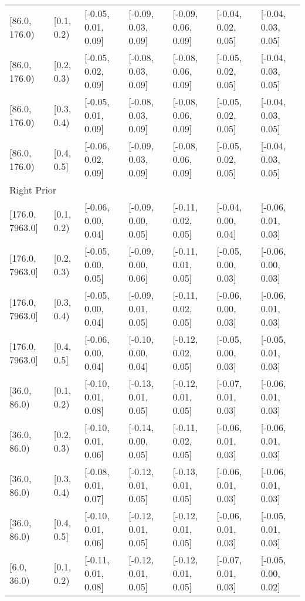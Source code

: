 \begin{table}[ht]
\begin{tabular}{lllllll}
  {[86.0, 176.0)} & {[0.1, 0.2)} & {[-0.05, 0.01, 0.09]} & {[-0.09, 0.03, 0.09]} & {[-0.09, 0.06, 0.09]} & {[-0.04, 0.02, 0.05]} & {[-0.04, 0.03, 0.05]} \\ 
  {[86.0, 176.0)} & {[0.2, 0.3)} & {[-0.05, 0.02, 0.09]} & {[-0.08, 0.03, 0.09]} & {[-0.08, 0.06, 0.09]} & {[-0.05, 0.02, 0.05]} & {[-0.04, 0.03, 0.05]} \\ 
  {[86.0, 176.0)} & {[0.3, 0.4)} & {[-0.05, 0.01, 0.09]} & {[-0.08, 0.03, 0.09]} & {[-0.08, 0.06, 0.09]} & {[-0.05, 0.02, 0.05]} & {[-0.04, 0.03, 0.05]} \\ 
  {[86.0, 176.0)} & {[0.4, 0.5]} & {[-0.06, 0.02, 0.09]} & {[-0.09, 0.03, 0.09]} & {[-0.08, 0.06, 0.09]} & {[-0.05, 0.02, 0.05]} & {[-0.04, 0.03, 0.05]} \\ 
   \midrule
\multicolumn{7}{l}{Right Prior}\\
{[176.0, 7963.0]} & {[0.1, 0.2)} & {[-0.06, 0.00, 0.04]} & {[-0.09, 0.00, 0.05]} & {[-0.11, 0.02, 0.05]} & {[-0.04, 0.00, 0.04]} & {[-0.06, 0.01, 0.03]} \\ 
  {[176.0, 7963.0]} & {[0.2, 0.3)} & {[-0.05, 0.00, 0.05]} & {[-0.09, 0.00, 0.06]} & {[-0.11, 0.01, 0.05]} & {[-0.05, 0.00, 0.03]} & {[-0.06, 0.00, 0.03]} \\ 
  {[176.0, 7963.0]} & {[0.3, 0.4)} & {[-0.05, 0.00, 0.04]} & {[-0.09, 0.01, 0.05]} & {[-0.11, 0.02, 0.05]} & {[-0.06, 0.00, 0.03]} & {[-0.06, 0.01, 0.03]} \\ 
  {[176.0, 7963.0]} & {[0.4, 0.5]} & {[-0.06, 0.00, 0.04]} & {[-0.10, 0.00, 0.04]} & {[-0.12, 0.02, 0.05]} & {[-0.05, 0.00, 0.03]} & {[-0.05, 0.01, 0.03]} \\ 
  {[36.0, 86.0)} & {[0.1, 0.2)} & {[-0.10, 0.01, 0.08]} & {[-0.13, 0.01, 0.05]} & {[-0.12, 0.01, 0.05]} & {[-0.07, 0.01, 0.03]} & {[-0.06, 0.01, 0.03]} \\ 
  {[36.0, 86.0)} & {[0.2, 0.3)} & {[-0.10, 0.01, 0.06]} & {[-0.14, 0.00, 0.05]} & {[-0.11, 0.02, 0.05]} & {[-0.06, 0.01, 0.03]} & {[-0.06, 0.01, 0.03]} \\ 
  {[36.0, 86.0)} & {[0.3, 0.4)} & {[-0.08, 0.01, 0.07]} & {[-0.12, 0.01, 0.05]} & {[-0.13, 0.01, 0.05]} & {[-0.06, 0.01, 0.03]} & {[-0.06, 0.01, 0.03]} \\ 
  {[36.0, 86.0)} & {[0.4, 0.5]} & {[-0.10, 0.01, 0.06]} & {[-0.12, 0.01, 0.05]} & {[-0.12, 0.01, 0.05]} & {[-0.06, 0.01, 0.03]} & {[-0.05, 0.01, 0.03]} \\ 
  {[6.0, 36.0)} & {[0.1, 0.2)} & {[-0.11, 0.01, 0.08]} & {[-0.12, 0.01, 0.05]} & {[-0.12, 0.01, 0.05]} & {[-0.07, 0.01, 0.03]} & {[-0.05, 0.00, 0.02]} \\ 

\end{tabular}
\end{table}
